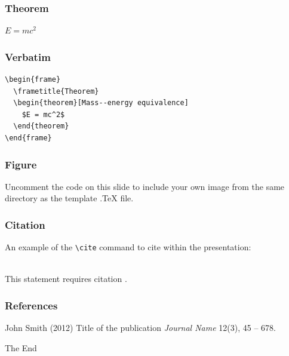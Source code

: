 \documentclass{beamer}
\begin{document}

\begin{frame}
  \frametitle{Theorem}
  \begin{theorem}
    $E = mc^2$
  \end{theorem}
\end{frame}


\begin{frame}[fragile] %
  \frametitle{Verbatim}
  \begin{example}
\begin{verbatim}
\begin{frame}
  \frametitle{Theorem}
  \begin{theorem}[Mass--energy equivalence]
    $E = mc^2$
  \end{theorem}
\end{frame}\end{verbatim}
\end{example}
\end{frame}


\begin{frame}
  \frametitle{Figure}
  Uncomment the code on this slide to include your own image from the same directory as the template .TeX file.
\end{frame}


\begin{frame}[fragile] %
  \frametitle{Citation}
  An example of the \verb|\cite| command to cite within the presentation:\\~

  This statement requires citation \cite{p1}.
\end{frame}


\begin{frame}
  \frametitle{References}
  \footnotesize{
    \begin{thebibliography}{99} %
     John Smith (2012)
      \newblock Title of the publication
      \newblock \emph{Journal Name} 12(3), 45 -- 678.
    \end{thebibliography}
  }
\end{frame}


\begin{frame}
  \Huge{\centerline{The End}}
\end{frame}

\end{document}
